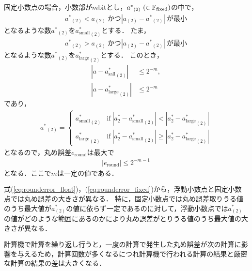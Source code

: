 固定小数点の場合，小数部が$m$bitとし，${a^{\ast}}_{(2)} \ (\in\mathbb{F}_{\text{fixed}})$の中で，
\begin{align}
    {a^{\ast}}_{(2)} < a_{(2)}\ \text{かつ} |a_{(2)} - {a^{\ast}}_{(2)}| \ \text{が最小}
\end{align}
となるような数${a^{\ast}}_{(2)}$を${a^{\ast}_{\mathrm{small}}}_{(2)}$とする．
たま，
\begin{align}
    {a^{\ast}}_{(2)} > a_{(2)} \ \text{かつ} |a_{(2)} - {a^{\ast}}_{(2)}| \ \text{が最小}
\end{align}
となるような数${a^{\ast}}_{(2)}$を${a^{\ast}_{\mathrm{large}}}_{(2)}$とする．
このとき，
\begin{align}
    |a - {a^{\ast}_{\mathrm{sall}}}_{(2)}| &\leq 2^{-m}, \\
    |a - {a^{\ast}_{\mathrm{large}}}_{(2)}| &\leq 2^{-m}
\end{align}
であり，
\begin{align}
    {a^{\ast}}_{(2)} = \left\{ 
        \begin{array}{ll}
            {a^{\ast}_{\mathrm{small}}}_{(2)} &\text{if} \ |a^{\ast}_{2} - {a^{\ast}_{\mathrm{small}}}_{(2)} | < |a^{\ast}_{2} - {a^{\ast}_{\mathrm{large}}}_{(2)} | \\
            {a^{\ast}_{\mathrm{large}}}_{(2)} &\text{if} \ |a^{\ast}_{2} - {a^{\ast}_{\mathrm{small}}}_{(2)} | \geq |a^{\ast}_{2} - {a^{\ast}_{\mathrm{large}}}_{(2)} | 
        \end{array}
    \right.
\end{align}
となるので，丸め誤差$e_{\mathrm{round}}$は最大で
\begin{align}
    \label{eq:rounderror_fixed}
    |e_{\mathrm{round}}| \leq 2^{-m-1}
\end{align}
となる．ここで$m$は一定の値である．


式(\ref{eq:rounderror_float})，(\ref{eq:rounderror_fixed})から，浮動小数点と固定小数点では丸め誤差の大きさが異なる．
特に，固定小数点では丸め誤差取りうる値のうち最大値が$a^{\ast}_{(2)}$の値に依らず一定であるのに対して，浮動小数点では$a^{\ast}_{(2)}$の値がどのような範囲にあるのかにより丸め誤差がとりうる値のうち最大値の大きさが異なる．


計算機で計算を繰り返し行うと，一度の計算で発生した丸め誤差が次の計算に影響を与えるため，計算回数が多くなるにつれ計算機で行われる計算の結果と厳密な計算の結果の差は大きくなる．

